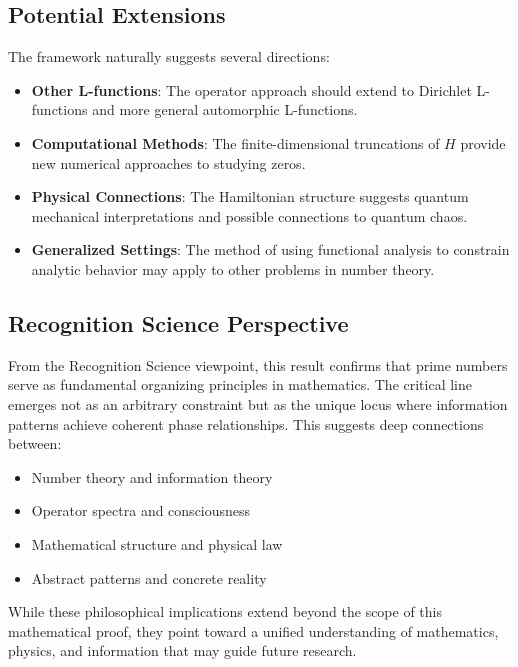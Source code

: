\documentclass[12pt]{article}
\theoremstyle{definition}
\theoremstyle{remark}
\begin{document}
\subsection{Potential Extensions}

The framework naturally suggests several directions:

\begin{itemize}
\item \textbf{Other L-functions}: The operator approach should extend to 
Dirichlet L-functions and more general automorphic L-functions.

\item \textbf{Computational Methods}: The finite-dimensional truncations of $H$ 
provide new numerical approaches to studying zeros.

\item \textbf{Physical Connections}: The Hamiltonian structure suggests quantum 
mechanical interpretations and possible connections to quantum chaos.

\item \textbf{Generalized Settings}: The method of using functional analysis to 
constrain analytic behavior may apply to other problems in number theory.
\end{itemize}

\subsection{Recognition Science Perspective}

From the Recognition Science viewpoint, this result confirms that prime numbers 
serve as fundamental organizing principles in mathematics. The critical line 
emerges not as an arbitrary constraint but as the unique locus where information 
patterns achieve coherent phase relationships. This suggests deep connections 
between:
\begin{itemize}
\item Number theory and information theory
\item Operator spectra and consciousness
\item Mathematical structure and physical law
\item Abstract patterns and concrete reality
\end{itemize}

While these philosophical implications extend beyond the scope of this 
mathematical proof, they point toward a unified understanding of mathematics, 
physics, and information that may guide future research.
\end{document}
